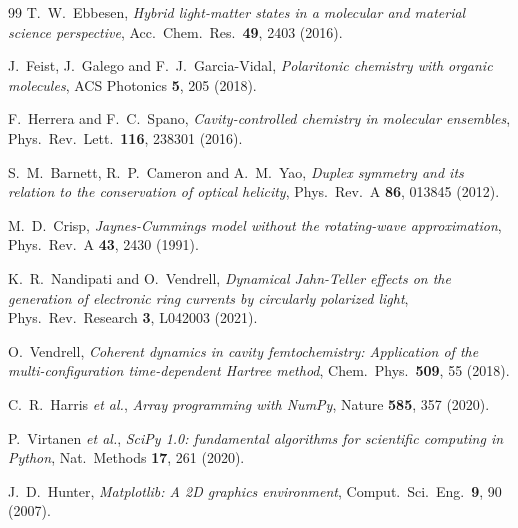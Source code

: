 \documentclass[12pt,a4paper]{article}
\begin{document}
\begin{thebibliography}{99}
T.~W.~Ebbesen,
\textit{Hybrid light-matter states in a molecular and material science
perspective},
Acc.\ Chem.\ Res.\ \textbf{49}, 2403 (2016).

J.~Feist, J.~Galego and F.~J.~Garcia-Vidal,
\textit{Polaritonic chemistry with organic molecules},
ACS Photonics \textbf{5}, 205 (2018).

F.~Herrera and F.~C.~Spano,
\textit{Cavity-controlled chemistry in molecular ensembles},
Phys.\ Rev.\ Lett.\ \textbf{116}, 238301 (2016).

S.~M.~Barnett, R.~P.~Cameron and A.~M.~Yao,
\textit{Duplex symmetry and its relation to the conservation of optical
helicity},
Phys.\ Rev.\ A \textbf{86}, 013845 (2012).

M.~D.~Crisp,
\textit{Jaynes-Cummings model without the rotating-wave approximation},
Phys.\ Rev.\ A \textbf{43}, 2430 (1991).

K.~R.~Nandipati and O.~Vendrell,
\textit{Dynamical Jahn-Teller effects on the generation of electronic ring
currents by circularly polarized light},
Phys.\ Rev.\ Research \textbf{3}, L042003 (2021).

O.~Vendrell,
\textit{Coherent dynamics in cavity femtochemistry: Application of the
multi-configuration time-dependent Hartree method},
Chem.\ Phys.\ \textbf{509}, 55 (2018).

C.~R.~Harris \emph{et al.},
\textit{Array programming with NumPy},
Nature \textbf{585}, 357 (2020).

P.~Virtanen \emph{et al.},
\textit{SciPy 1.0: fundamental algorithms for scientific computing in
Python},
Nat.\ Methods \textbf{17}, 261 (2020).

J.~D.~Hunter,
\textit{Matplotlib: A 2D graphics environment},
Comput.\ Sci.\ Eng.\ \textbf{9}, 90 (2007).

\end{thebibliography}
\end{document}

